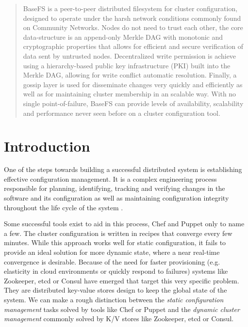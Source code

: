 \documentclass{sig-alternate}
\begin{document}
\maketitle
\begin{abstract}
BaseFS is a peer-to-peer distributed filesystem for cluster configuration, designed to operate under the harsh network conditions commonly found on Community Networks. Nodes do not need to trust each other, the core data-structure is an append-only Merkle DAG with monotonic and cryptographic properties that allows for efficient and secure verification of data sent by untrusted nodes. Decentralized write permission is achieve using a hierarchy-based public key infrastructure (PKI) built into the Merkle DAG, allowing for write conflict automatic resolution. Finally, a gossip layer is used for disseminate changes very quickly and efficiently as well as for maintaining cluster membership in an scalable way. With no single point-of-failure, BaseFS can provide levels of availability, scalability and performance never seen before on a cluster configuration tool.

\end{abstract}
\section{Introduction}

One of the steps towards building a successful distributed system is establishing effective configuration management. It is a complex engineering process responsible for planning, identifying, tracking and verifying changes in the software and its configuration as well as maintaining configuration integrity throughout the life cycle of the system \cite{Yermolaiev:managing}.

Some successful tools exist to aid in this process, Chef and Puppet only to name a few. The cluster configuration is written in recipes that converge every few minutes. While this approach works well for static configuration, it fails to provide an ideal solution for more dynamic state, where a near real-time convergence is desirable. Because of the need for faster provisioning (e.g. elasticity in cloud environments or quickly respond to failures) systems like Zookeeper, etcd or Consul have emerged that target this very specific problem. They are distributed key-value stores design to keep the global state of the system. We can make a rough distinction between the \textit{static configuration management} tasks solved by tools like Chef or Puppet and the \textit{dynamic cluster management} commonly solved by K/V stores like Zookeeper, etcd or Consul.
\end{document}
